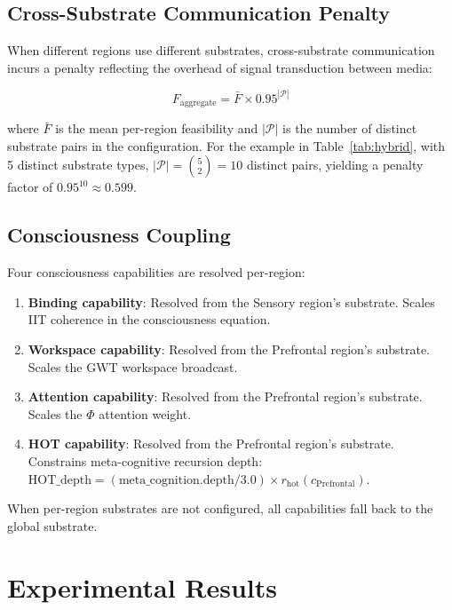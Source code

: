 \documentclass[12pt,a4paper]{article}
\begin{document}
\subsection{Cross-Substrate Communication Penalty}

When different regions use different substrates, cross-substrate communication incurs a penalty reflecting the overhead of signal transduction between media:

\begin{equation}
F_{\text{aggregate}} = \bar{F} \times 0.95^{|\mathcal{P}|}
\label{eq:penalty}
\end{equation}

where $\bar{F}$ is the mean per-region feasibility and $|\mathcal{P}|$ is the number of distinct substrate pairs in the configuration. For the example in Table~\ref{tab:hybrid}, with 5 distinct substrate types, $|\mathcal{P}| = \binom{5}{2} = 10$ distinct pairs, yielding a penalty factor of $0.95^{10} \approx 0.599$.

\subsection{Consciousness Coupling}

Four consciousness capabilities are resolved per-region:

\begin{enumerate}
    \item \textbf{Binding capability}: Resolved from the Sensory region's substrate. Scales IIT coherence in the consciousness equation.
    \item \textbf{Workspace capability}: Resolved from the Prefrontal region's substrate. Scales the GWT workspace broadcast.
    \item \textbf{Attention capability}: Resolved from the Prefrontal region's substrate. Scales the $\Phi$ attention weight.
    \item \textbf{HOT capability}: Resolved from the Prefrontal region's substrate. Constrains meta-cognitive recursion depth: $\text{HOT\_depth} = (\text{meta\_cognition.depth} / 3.0) \times r_{\text{hot}}(c_{\text{Prefrontal}})$.
\end{enumerate}

When per-region substrates are not configured, all capabilities fall back to the global substrate.

\section{Experimental Results}
\end{document}
